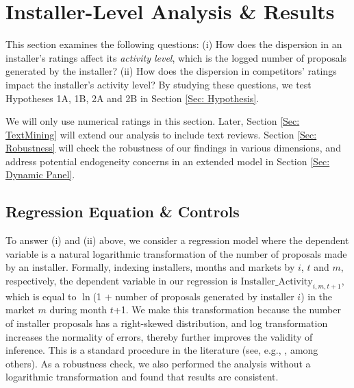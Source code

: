 \documentclass[msom,blindrev]{informs3}
\begin{document}
	
	
	
	
	
	\section{Installer-Level Analysis \& Results} \label{Sec: Installer-level}
	
	This section examines the following questions: (i) How does the dispersion in an installer's ratings affect its \emph{activity level}, which is the logged  number of proposals generated by the installer? (ii) How does the dispersion in competitors' ratings impact the installer's activity level? By studying these questions, we test Hypotheses 1A, 1B, 2A and 2B in Section \ref{Sec: Hypothesis}.
	
	
	We will only use numerical ratings in this section. Later, Section \ref{Sec: TextMining}  will extend our analysis to include text reviews. Section \ref{Sec: Robustness} will check the robustness of our findings in various dimensions, and address potential endogeneity concerns in an extended model in Section \ref{Sec: Dynamic Panel}.
	
	\subsection{Regression Equation \& Controls}
	
	To answer (i) and (ii) above, we consider a regression model where the dependent variable is a natural logarithmic transformation of the number of proposals made by an installer. Formally, indexing installers, months and markets by $i$, $t$ and $m$, respectively, the dependent variable in our regression is  $\text{Installer\_Activity}_{i,m,t+1}$, which is equal to $\ln$(1 $+$ number of proposals generated by installer $i$) in the market $m$ during month $t$+1. We make this transformation because the number of installer proposals has a right-skewed distribution, and log transformation increases the normality of errors, thereby further improves the validity of inference. This is a standard procedure in the literature (see, e.g., \citet{song2017closing,tan2014does}, among others). As a robustness check, we also performed the analysis without a logarithmic transformation and found that results are consistent.
	
\end{document}
